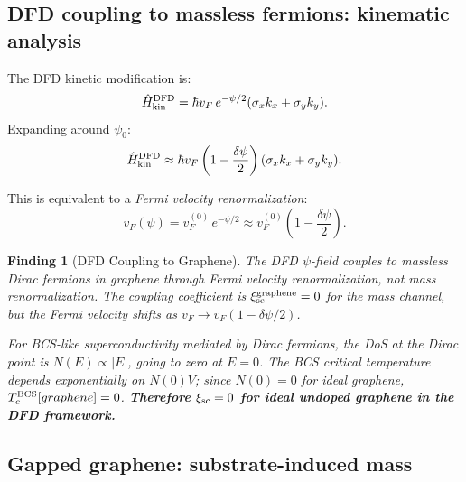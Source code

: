 \documentclass[11pt]{article}
\newtheorem{finding}{Finding}
\begin{document}
\subsection{DFD coupling to massless fermions: kinematic analysis}

The DFD kinetic modification is:
\begin{equation}
\hat{H}_{\rm kin}^{\rm DFD} = \hbar v_F\,e^{-\psi/2}(\sigma_x k_x + \sigma_y k_y).
\label{eq:Dirac-psi}
\end{equation}
Expanding around $\psi_0$:
\begin{equation}
\hat{H}_{\rm kin}^{\rm DFD} \approx \hbar v_F
  \left(1 - \frac{\delta\psi}{2}\right)(\sigma_x k_x + \sigma_y k_y).
\label{eq:Dirac-psi-expand}
\end{equation}

This is equivalent to a \emph{Fermi velocity renormalization}:
\begin{equation}
v_F(\psi) = v_F^{(0)}\,e^{-\psi/2}
\approx v_F^{(0)}\left(1 - \frac{\delta\psi}{2}\right).
\label{eq:vF-psi}
\end{equation}

\begin{finding}[DFD Coupling to Graphene]
The DFD $\psi$-field couples to massless Dirac fermions in graphene
through Fermi velocity renormalization, not mass renormalization. The coupling
coefficient is $\xi_{\rm sc}^{\rm graphene} = 0$ for the mass channel,
but the Fermi velocity shifts as $v_F \to v_F(1 - \delta\psi/2)$.

For BCS-like superconductivity mediated by Dirac fermions, the DoS at the
Dirac point is $N(E) \propto |E|$, going to zero at $E = 0$. The BCS
critical temperature depends exponentially on $N(0)V$; since
$N(0) = 0$ for ideal graphene, $T_c^{\rm BCS}[graphene] = 0$.
\textbf{Therefore $\xi_{\rm sc} = 0$ for ideal undoped graphene in the
DFD framework.}
\end{finding}

\subsection{Gapped graphene: substrate-induced mass}
\end{document}
